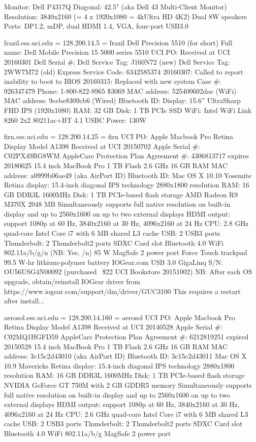 \documentclass[12pt,twoside]{article}
\begin{document}
Monitor: Dell P4317Q
Diagonal: 42.5" (aka Dell 43 Multi-Client Monitor)
Resolution: 3840x2160 (= 4 x 1920x1080 = 4kUltra HD 4K2)
Dual 8W speakers
Ports: DP1.2, mDP, dual HDMI 1.4, VGA, four-port USB3.0

frazil.ess.uci.edu = 128.200.14.5 = frazil
Dell Precision 5510 (for short)
Full name: Dell Mobile Precision 15 5000 series 5510
UCI PO: 
Received at UCI 20160301
Dell Serial \#: 
Dell Service Tag: J160N72 (new)
Dell Service Tag: 2WW7M72 (old)
Express Service Code: 6342585374
20160307: Called to report inability to boot to BIOS
20160315: Replaced with new system
Case #: 926347479
Phone: 1-800-822-8965
\$3069
MAC address: 525400602dae (WiFi)
MAC address: 9cebe8309cb6 (Wired)
Bluetooth ID: 
Display: 15.6'' UltraSharp FHD IPS (1920x1080) 
RAM: 32 GB 
Disk: 1 TB PCIe SSD
WiFi: Intel WiFi Link 8260 2x2 80211ac+BT 4.1
USBC
Power: 130W

firn.ess.uci.edu = 128.200.14.25 = firn
UCI PO: 
Apple Macbook Pro Retina Display
Model A1398
Received at UCI 20150702
Apple Serial \#: C02PX49RG8WM
AppleCare Protection Plan Agreement \#: 4306813717 expires 20180625
15.4 inch MacBook Pro
1 TB Flash
2.6 GHz
16 GB RAM
MAC address: a0999b06ae49 (aka AirPort ID)
Bluetooth ID: 
Mac OS X 10.10 Yosemite
Retina display: 15.4-inch diagonal
IPS technology 2880x1800 resolution
RAM: 16 GB DDR3L 1600MHz
Disk: 1 TB PCIe-based flash storage
AMD Radeon R9 M370X 2048 MB
Simultaneously supports full native resolution on built-in display and up to 2560x1600 on up to two external displays
HDMI output: support 1080p at 60 Hz, 3840x2160 at 30 Hz, 4096x2160 at 24 Hz
CPU: 2.8 GHz quad-core Intel Core i7 with 6 MB shared L3 cache
USB: 2 USB3 ports
Thunderbolt: 2 Thunderbolt2 ports
SDXC Card slot
Bluetooth 4.0
WiFi 802.11a/b/g/n (NB: Yes, /n)
85 W MagSafe 2 power port
Force Touch trackpad
99.5 W-hr lithium-polymer battery
IOGear.com USB 3.0 GigaLinq S/N: OU56USG4N00092 (purchased ~\$22 UCI Bookstore 20151002)
NB: After each OS upgrade, obtain/reinstall IOGear driver from
https://www.iogear.com/support/dm/driver/GUC3100
This requires a restart after install...

aerosol.ess.uci.edu = 128.200.14.160 = aerosol
UCI PO: 
Apple Macbook Pro Retina Display
Model A1398
Received at UCI 20140528
Apple Serial \#: C02MQ1HGFD59
AppleCare Protection Plan Agreement \#: 6212819251 expired 20150528
15.4 inch MacBook Pro
1 TB Flash
2.6 GHz
16 GB RAM
MAC address: 3c15c2d43010 (aka AirPort ID)
Bluetooth ID: 3c15c2d43011
Mac OS X 10.9 Mavericks
Retina display: 15.4-inch diagonal
IPS technology 2880x1800 resolution
RAM: 16 GB DDR3L 1600MHz
Disk: 1 TB PCIe-based flash storage
NVIDIA GeForce GT 750M with 2 GB GDDR5 memory
Simultaneously supports full native resolution on built-in display and up to 2560x1600 on up to two external displays
HDMI output: support 1080p at 60 Hz, 3840x2160 at 30 Hz, 4096x2160 at 24 Hz
CPU: 2.6 GHz quad-core Intel Core i7 with 6 MB shared L3 cache
USB: 2 USB3 ports
Thunderbolt: 2 Thunderbolt2 ports
SDXC Card slot
Bluetooth 4.0
WiFi 802.11a/b/g 
MagSafe 2 power port
\end{document}
